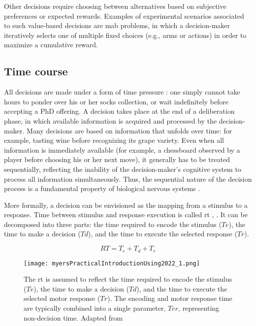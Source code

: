 Other decisions require choosing between alternatives based on subjective preferences or expected rewards. Examples of experimental scenarios associated to such value-based decisions are \acrlong{mab} problems, in which a decision-maker iteratively selects one of multiple fixed choices (e.g., arms or actions) in order to maximize a cumulative reward.

\subsection{Time course}

All decisions are made under a form of time pressure \cite{forstmannSequentialSamplingModels2016}: one simply cannot take hours to ponder over his or her socks collection, or wait indefinitely before accepting a PhD offering. A decision takes place at the end of a deliberation phase, in which available information is acquired and processed by the decision-maker. Many decisions are based on information that unfolds over time: for example, tasting wine before recognizing its grape variety. Even when all information is immediately available (for example, a chessboard observed by a player before choosing his or her next move), it generally has to be treated sequentially, reflecting the inability of the decision-maker's cognitive system to process all information simultaneously. Thus, the sequential nature of the decision process is a fundamental property of biological nervous systems \cite{forstmannSequentialSamplingModels2016}.

More formally, a decision can be envisioned as the mapping from a stimulus to a response. Time between stimulus and response execution is called \acrfull{rt} \cite{forstmannSequentialSamplingModels2016}, \cite{myersPracticalIntroductionUsing2022}. It can be decomposed into three parts: the time required to encode the stimulus ($Te$), the time to make a decision ($Td$), and the time to execute the selected response ($Tr$).

$$RT = T_e+T_d+T_r$$

\begin{figure}[ht]
    \centering
    \texttt{[image: myersPracticalIntroductionUsing2022\_1.png]}
    \caption[Decomposition of \acrlong{rt} for a decision]{The \acrfull{rt} is assumed to reflect the time required to encode the stimulus ($Te$), the time to make a decision ($Td$), and the time to execute the selected motor response ($Tr$). The encoding and motor response time are typically combined into a single parameter, $Ter$, representing non-decision time. Adapted from \cite{myersPracticalIntroductionUsing2022}}
\end{figure}

